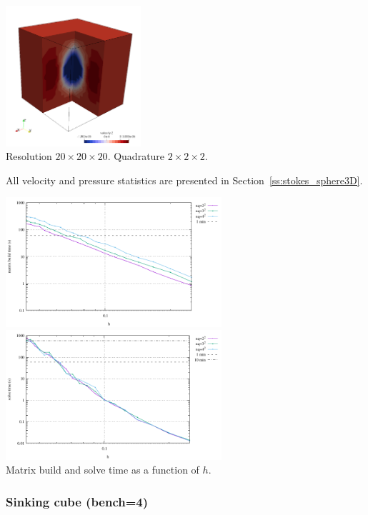 \begin{center}
\includegraphics[width=5cm]{python_codes/fieldstone_82/results/bench3/w.png}\\
{\captionfont Resolution $20\times 20\times 20$. Quadrature $2\times 2 \times 2$.} 
\end{center}

All velocity and pressure statistics are presented in Section~\ref{ss:stokes_sphere3D}.

\begin{center}
\includegraphics[width=8cm]{python_codes/fieldstone_82/results/bench3/build.pdf}
\includegraphics[width=8cm]{python_codes/fieldstone_82/results/bench3/solve.pdf}\\
{\captionfont Matrix build and solve time as a function of $h$.}
\end{center}

\subsubsection*{Sinking cube (bench=4)}


